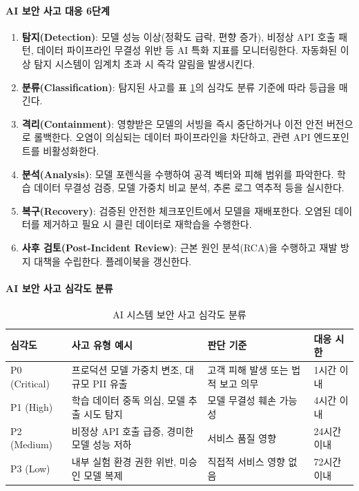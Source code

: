 \paragraph{AI 보안 사고 대응 6단계}

\begin{enumerate}
    \item \textbf{탐지(Detection)}: 모델 성능 이상(정확도 급락, 편향 증가), 비정상 API 호출 패턴, 데이터 파이프라인 무결성 위반 등 AI 특화 지표를 모니터링한다. 자동화된 이상 탐지 시스템이 임계치 초과 시 즉각 알림을 발생시킨다.
    \item \textbf{분류(Classification)}: 탐지된 사고를 표 \ref{tab:incident_severity_security}의 심각도 분류 기준에 따라 등급을 매긴다.
    \item \textbf{격리(Containment)}: 영향받은 모델의 서빙을 즉시 중단하거나 이전 안전 버전으로 롤백한다. 오염이 의심되는 데이터 파이프라인을 차단하고, 관련 API 엔드포인트를 비활성화한다.
    \item \textbf{분석(Analysis)}: 모델 포렌식을 수행하여 공격 벡터와 피해 범위를 파악한다. 학습 데이터 무결성 검증, 모델 가중치 비교 분석, 추론 로그 역추적 등을 실시한다.
    \item \textbf{복구(Recovery)}: 검증된 안전한 체크포인트에서 모델을 재배포한다. 오염된 데이터를 제거하고 필요 시 클린 데이터로 재학습을 수행한다.
    \item \textbf{사후 검토(Post-Incident Review)}: 근본 원인 분석(RCA)을 수행하고 재발 방지 대책을 수립한다. 플레이북을 갱신한다.
\end{enumerate}

\paragraph{AI 보안 사고 심각도 분류}

\begin{table}[htbp]
\centering
\caption{AI 시스템 보안 사고 심각도 분류}
\label{tab:incident_severity_security}
\begin{tabularx}{\textwidth}{p{1.5cm}p{3cm}Xp{2.5cm}}
\toprule
\textbf{심각도} & \textbf{사고 유형 예시} & \textbf{판단 기준} & \textbf{대응 시한} \\
\midrule
P0 (Critical) & 프로덕션 모델 가중치 변조, 대규모 PII 유출 & 고객 피해 발생 또는 법적 보고 의무 & 1시간 이내 \\
P1 (High) & 학습 데이터 중독 의심, 모델 추출 시도 탐지 & 모델 무결성 훼손 가능성 & 4시간 이내 \\
P2 (Medium) & 비정상 API 호출 급증, 경미한 모델 성능 저하 & 서비스 품질 영향 & 24시간 이내 \\
P3 (Low) & 내부 실험 환경 권한 위반, 미승인 모델 복제 & 직접적 서비스 영향 없음 & 72시간 이내 \\
\bottomrule
\end{tabularx}
\end{table}

